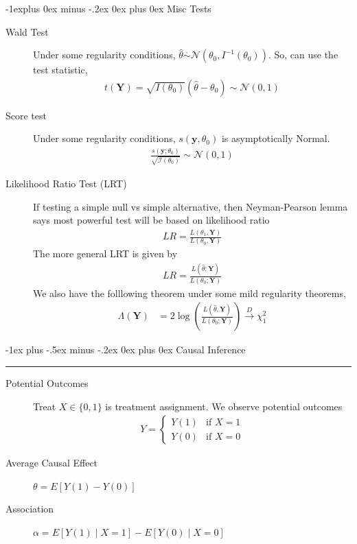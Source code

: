 \documentclass[10pt,landscape]{article}
\makeatletter
\newcommand{\N}{\mathcal{N}}
\newcommand{\I}{\mathcal{I}}
\renewcommand\vec{\mathbf}
\renewcommand{\section}{\@startsection{section}{1}{0mm}%
                                {-1ex plus -.5ex minus -.2ex}%
                                {0ex plus 0ex}%
                                {\normalfont\medium\bfseries}}
\renewcommand{\subsection}{\@startsection{subsection}{2}{0mm}%
                                {-1explus 0ex minus -.2ex}%
                                {0ex plus 0ex}%
                                {\normalfont\small\bfseries}}
\makeatother
\begin{document}
\begin{multicols*}{3}
\subsection{Misc Tests}
\begin{description}
\item[Wald Test] Under some regularity conditions, $\hat\theta \stackrel{\cdot}{\sim} \N(\theta_0, I^{-1}(\theta_0))$. So, can use the test statistic,
\begin{align*}
    t(\vec{Y}) = \sqrt{I(\theta_0)}(\hat\theta - \theta_0) \sim \N(0, 1)
\end{align*} 
\item[Score test] Under some regularity conditions, $s(\vec{y}, \theta_0)$ is asymptotically Normal.
\begin{align*}
    \frac{s(\vec{y}; \theta_0)}{\sqrt{\I(\theta_0)}} \sim \N(0, 1)
\end{align*} 
\item[Likelihood Ratio Test (LRT)] If testing a simple null vs simple alternative, then Neyman-Pearson lemma says most powerful test will be based on likelihood ratio 
\begin{align*}
    LR = \frac{L(\theta_1, \vec{Y})}{L(\theta_0, \vec{Y})}
\end{align*} 
The more general LRT is given by
\begin{align*}
    LR = \frac{L(\hat\theta; \vec{Y})}{L(\theta_0; \vec{Y})}
\end{align*}
We also have the folllowing theorem under some mild regularity theorems, 
\begin{align*}
    \Lambda(\vec{Y}) &= 2 \log\left(\frac{L(\hat\theta, \vec{Y})}{L(\theta_0; \vec{Y})}\right) \stackrel{D}{\to} \chi_1^2
\end{align*}
\end{description}

\section{Causal Inference} \hrule height 1pt
\begin{description} 
\item[Potential Outcomes] Treat $X \in \{0, 1\}$ is treatment assignment. We observe potential outcomes
\begin{align*}
    Y = \begin{cases}
        Y(1) & \text{if } X = 1 \\ 
        Y(0) & \text{if } X = 0
    \end{cases}
\end{align*}
\item[Average Causal Effect] $\theta = E[Y(1) - Y(0)]$
\item[Association] $\alpha = E[Y(1) \mid X = 1] - E[Y(0) \mid X = 0]$


\end{description}
\end{multicols*}
\end{document}
